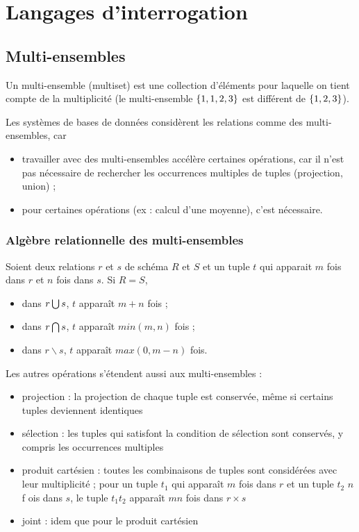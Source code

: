 \chapter{Langages d'interrogation}

	\section{Multi-ensembles}
	Un multi-ensemble (multiset) est une collection d'éléments pour laquelle on tient compte de la multiplicité (le multi-ensemble $\lbrace 1, 1, 2, 3 \rbrace$ est différent de $\lbrace 1, 2, 3 \rbrace$).

	Les systèmes de bases de données considèrent les relations comme des multi-ensembles, car

	\begin{itemize}
		\item travailler avec des multi-ensembles accélère certaines opérations, car il n'est pas nécessaire de rechercher les occurrences multiples de tuples (projection, union) ;
		\item pour certaines opérations (ex : calcul d'une moyenne), c'est nécessaire.
	\end{itemize}
	
	\subsection{Algèbre relationnelle des multi-ensembles}
	Soient deux relations $r$ et $s$ de schéma $R$ et $S$ et un tuple $t$ qui apparait $m$ fois dans $r$ et $n$ fois dans $s$. Si $R = S$,
	
	\begin{itemize}
		\item dans $r \bigcup s$, $t$ apparaît $m + n$ fois ;
		\item dans $r \bigcap s$, $t$ apparaît $min(m, n)$ fois ;
		\item dans $r \backslash s$, $t$ apparaît $max(0, m - n)$ fois.
	\end{itemize}
	
	Les autres opérations s'étendent aussi aux multi-ensembles :
	\begin{itemize}
		\item projection : la projection de chaque tuple est conservée, même si certains tuples deviennent identiques
		\item sélection : les tuples qui satisfont la condition de sélection sont conservés, y compris les occurrences multiples
		\item produit cartésien : toutes les combinaisons de tuples sont considérées avec leur multiplicité ; pour un tuple $t_1$ qui apparaît $m$ fois dans $r$ et un tuple $t_2$ $n$ f ois dans $s$, le tuple $t_1 t_2$ apparaît $mn$ fois dans $r \times s$
		\item joint : idem que pour le produit cartésien
	\end{itemize}

